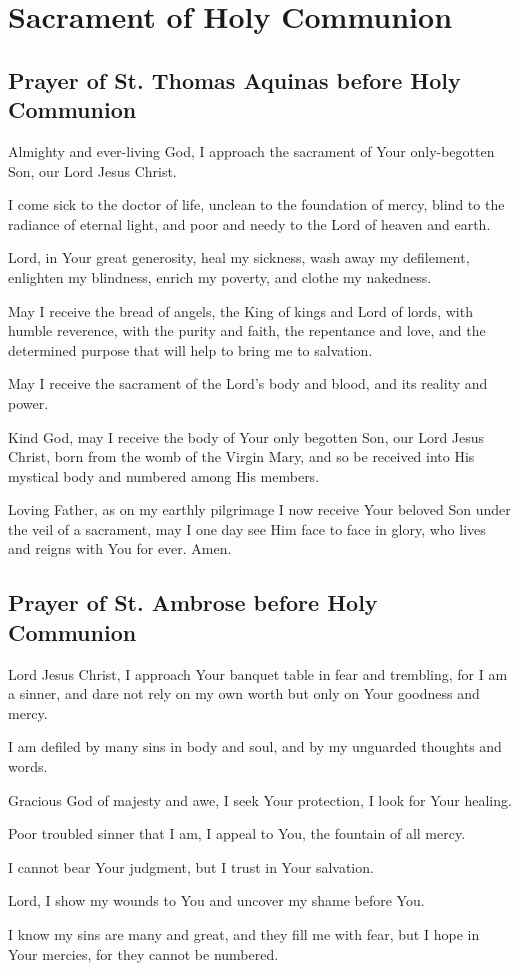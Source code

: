 \documentclass[12pt]{article}
\newcommand{\prayersection}[1]{\section{#1}}
\newcommand{\prayertitle}[1]{\subsection{#1}}
\begin{document}
\newpage

\prayersection{Sacrament of Holy Communion}
\prayertitle{Prayer of St. Thomas Aquinas before Holy Communion}
Almighty and ever-living God, I approach the sacrament of Your only-begotten Son, our Lord Jesus Christ.

I come sick to the doctor of life, unclean to the foundation of mercy, blind to the radiance of eternal light, and poor and needy to the Lord of heaven and earth.

Lord, in Your great generosity, heal my sickness, wash away my defilement, enlighten my blindness, enrich my poverty, and clothe my nakedness.

May I receive the bread of angels, the King of kings and Lord of lords, with humble reverence, with the purity and faith, the repentance and love, and the determined purpose that will help to bring me to salvation.

May I receive the sacrament of the Lord's body and blood, and its reality and power.

Kind God, may I receive the body of Your only begotten Son, our Lord Jesus Christ, born from the womb of the Virgin Mary, and so be received into His mystical body and numbered among His members.

Loving Father, as on my earthly pilgrimage I now receive Your beloved Son under the veil of a sacrament, may I one day see Him face to face in glory, who lives and reigns with You for ever.
Amen.

\prayertitle{Prayer of St. Ambrose before Holy Communion}
Lord Jesus Christ, I approach Your banquet table in fear and trembling, for I am a sinner, and dare not rely on my own worth but only on Your goodness and mercy.

I am defiled by many sins in body and soul, and by my unguarded thoughts and words.

Gracious God of majesty and awe, I seek Your protection, I look for Your healing.

Poor troubled sinner that I am, I appeal to You, the fountain of all mercy.

I cannot bear Your judgment, but I trust in Your salvation.

Lord, I show my wounds to You and uncover my shame before You.

I know my sins are many and great, and they fill me with fear, but I hope in Your mercies, for they cannot be numbered.
\end{document}
